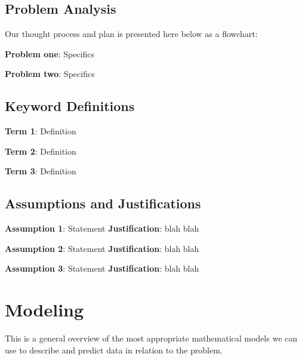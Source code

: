 \documentclass{mcmthesis}
\begin{document}
    \subsection{Problem Analysis}
    Our thought process and plan is presented here below as a flowchart:
    \begin{center}
    \end{center}

    \noindent\textbf{Problem one}: Specifics

    \noindent\textbf{Problem two}: Specifics

    \subsection{Keyword Definitions}
    \noindent\textbf{Term 1}: Definition

    \noindent\textbf{Term 2}: Definition

    \noindent\textbf{Term 3}: Definition

    \subsection{Assumptions and Justifications}
    \noindent\textbf{Assumption 1}: Statement
    \textbf{Justification}: blah blah

    \noindent\textbf{Assumption 2}: Statement
    \textbf{Justification}: blah blah

    \noindent\textbf{Assumption 3}: Statement
    \textbf{Justification}: blah blah


    \section{Modeling}
    This is a general overview of the most appropriate mathematical models we can use to describe and predict data in relation to the problem. 
\end{document}
